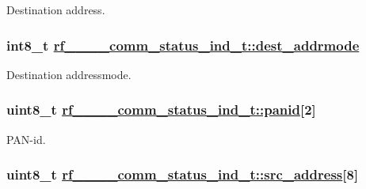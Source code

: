 Destination address. \hypertarget{structrf__802__15__4__comm__status__ind__t_71c54d414c1afbeb6074a8d0487cafde}{
\subsubsection[dest\_\-addrmode]{\setlength{\rightskip}{0pt plus 5cm}int8\_\-t \hyperlink{structrf__802__15__4__comm__status__ind__t_71c54d414c1afbeb6074a8d0487cafde}{rf\_\_\_\_\-comm\_\-status\_\-ind\_\-t::dest\_\-addrmode}}}
\label{structrf__802__15__4__comm__status__ind__t_71c54d414c1afbeb6074a8d0487cafde}


Destination addressmode. \hypertarget{structrf__802__15__4__comm__status__ind__t_05f311f7f9aa903839bd9785d539b96c}{
\subsubsection[panid]{\setlength{\rightskip}{0pt plus 5cm}uint8\_\-t \hyperlink{structrf__802__15__4__comm__status__ind__t_05f311f7f9aa903839bd9785d539b96c}{rf\_\_\_\_\-comm\_\-status\_\-ind\_\-t::panid}\mbox{[}2\mbox{]}}}
\label{structrf__802__15__4__comm__status__ind__t_05f311f7f9aa903839bd9785d539b96c}


PAN-id. \hypertarget{structrf__802__15__4__comm__status__ind__t_3d8825053b35dbb8ee9ea4fbd2226423}{
\subsubsection[src\_\-address]{\setlength{\rightskip}{0pt plus 5cm}uint8\_\-t \hyperlink{structrf__802__15__4__comm__status__ind__t_3d8825053b35dbb8ee9ea4fbd2226423}{rf\_\_\_\_\-comm\_\-status\_\-ind\_\-t::src\_\-address}\mbox{[}8\mbox{]}}}
\label{structrf__802__15__4__comm__status__ind__t_3d8825053b35dbb8ee9ea4fbd2226423}


